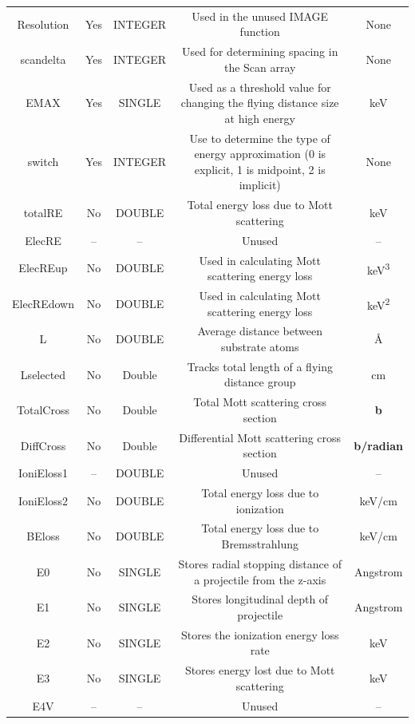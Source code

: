 \documentclass[10pt, reqno]{exam}
\begin{document}
{\begin{longtable}{|c|c|c|c|c|}
        Resolution & Yes & INTEGER & Used in the unused IMAGE function & None \\
        scandelta & Yes & INTEGER & Used for determining spacing in the Scan array & None \\
        EMAX & Yes & SINGLE & Used as a threshold value for changing the flying distance size at high energy &  keV \\
        switch & Yes & INTEGER & Use to determine the type of energy approximation (0 is explicit, 1 is midpoint, 2 is implicit) & None \\
        \hline
        totalRE & No & DOUBLE & Total energy loss due to Mott scattering & keV \\
        ElecRE  & -- & --  & Unused  & --  \\
        ElecREup    & No  & DOUBLE  & Used in calculating Mott scattering energy loss  & \si{keV^3}  \\
        ElecREdown  &  No & DOUBLE  &  Used in calculating Mott scattering energy loss & \si{keV^2}  \\
        L   &  No & DOUBLE  & Average distance between substrate atoms  & \si{\angstrom}  \\
        Lselected   & No  &  Double & Tracks total length of a flying distance group  & \si{\cm}  \\
        TotalCross  & No  &  Double & Total Mott scattering cross section &  \textbf{b} \\
        DiffCross  & No & Double & Differential Mott scattering cross section &  \textbf{b/radian} \\
        IoniEloss1  &  -- & DOUBLE  &  Unused & --  \\
        IoniEloss2  & No  &  DOUBLE & Total energy loss due to ionization & keV/cm  \\
        BEloss  & No  & DOUBLE  & Total energy loss due to Bremsstrahlung  & keV/cm  \\
        E0  & No & SINGLE  & Stores radial stopping distance of a projectile from the z-axis & Angstrom \\
        E1  & No  & SINGLE  & Stores longitudinal depth of projectile & Angstrom  \\
        E2  & No & SINGLE  & Stores the ionization energy loss rate  & keV \\
        E3  & No & SINGLE  & Stores energy lost due to Mott scattering  & keV  \\
        E4V     & -- & -- & Unused & --  \\
        \hline

\end{longtable}}
\end{document}
